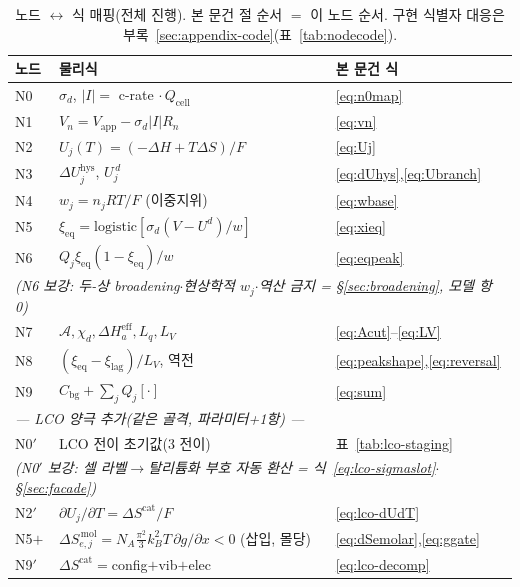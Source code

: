\documentclass[11pt,a4paper]{article}
\newcommand{\eff}{\mathrm{eff}}
\newcommand{\eq}{\mathrm{eq}}
\newcommand{\app}{\mathrm{app}}
\newcommand{\cell}{\mathrm{cell}}
\newcommand{\bg}{\mathrm{bg}}
\newcommand{\hys}{\mathrm{hys}}
\begin{document}
\begin{table}[t]
\centering
\renewcommand{\arraystretch}{1.3}
\caption{노드 $\leftrightarrow$ 식 매핑(전체 진행). 본 문건 절 순서 $=$ 이 노드 순서.
구현 식별자 대응은 부록~\ref{sec:appendix-code}(표~\ref{tab:nodecode}).}
\label{tab:nodemap}
\begin{tabular}{l l l}
\toprule
노드 & 물리식 & 본 문건 식 \\
\midrule
N0 & $\sigma_d$, $|I|=$ c-rate$\,\cdot Q_\cell$ & \eqref{eq:n0map} \\
N1 & $V_n=V_\app-\sigma_d|I|R_n$ & \eqref{eq:vn} \\
N2 & $U_j(T)=(-\Delta H+T\Delta S)/F$ & \eqref{eq:Uj} \\
N3 & $\Delta U_j^\hys$, $U_j^{\,d}$ & \eqref{eq:dUhys},\eqref{eq:Ubranch} \\
N4 & $w_j=n_jRT/F$ (이중지위) & \eqref{eq:wbase} \\
N5 & $\xi_\eq=\mathrm{logistic}[\sigma_d(V-U^d)/w]$ & \eqref{eq:xieq} \\
N6 & $Q_j\xi_\eq(1-\xi_\eq)/w$ & \eqref{eq:eqpeak} \\
\multicolumn{3}{l}{\emph{\quad(N6 보강: 두-상 broadening$\cdot$현상학적 $w_j$$\cdot$역산 금지 = \S\ref{sec:broadening}, 모델 항 0)}}\\
N7 & $\mathcal A,\chi_d,\Delta H_a^\eff,L_q,L_V$ & \eqref{eq:Acut}--\eqref{eq:LV} \\
N8 & $(\xi_\eq-\xi_\mathrm{lag})/L_V$, 역전 & \eqref{eq:peakshape},\eqref{eq:reversal} \\
N9 & $C_\bg+\sum_jQ_j[\cdot]$ & \eqref{eq:sum} \\
\midrule
\multicolumn{3}{l}{\emph{— LCO 양극 추가(같은 골격, 파라미터+1항) —}}\\
N0$'$ & LCO 전이 초기값(3 전이) & 표~\ref{tab:lco-staging} \\
\multicolumn{3}{l}{\emph{\quad(N0$'$ 보강: 셀 라벨$\to$탈리튬화 부호 자동 환산 = 식~\eqref{eq:lco-sigmaslot}$\cdot$\S\ref{sec:facade})}}\\
N2$'$ & $\partial U_j/\partial T=\Delta S^\mathrm{cat}/F$ & \eqref{eq:lco-dUdT} \\
N5$+$ & $\Delta S_{e,j}^{\,\mathrm{mol}}=N_A\tfrac{\pi^2}{3}k_B^2T\,\partial g/\partial x<0$ (삽입, 몰당) & \eqref{eq:dSemolar},\eqref{eq:ggate} \\
N9$'$ & $\Delta S^\mathrm{cat}=$config$+$vib$+$elec & \eqref{eq:lco-decomp} \\
\bottomrule
\end{tabular}
\end{table}
\end{document}
